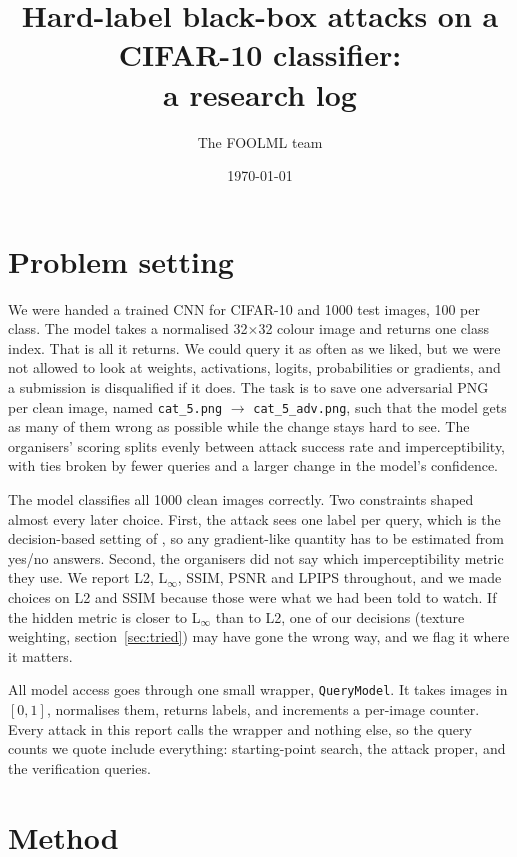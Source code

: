 \documentclass[11pt]{article}
\title{Hard-label black-box attacks on a CIFAR-10 classifier:\\ a research log}
\author{The FOOLML team}
\date{\today}
\begin{document}
\maketitle

\section{Problem setting}

We were handed a trained CNN for CIFAR-10 \cite{krizhevsky2009} and 1000 test images, 100 per class. The model takes a normalised 32$\times$32 colour image and returns one class index. That is all it returns. We could query it as often as we liked, but we were not allowed to look at weights, activations, logits, probabilities or gradients, and a submission is disqualified if it does. The task is to save one adversarial PNG per clean image, named \texttt{cat\_5.png} $\to$ \texttt{cat\_5\_adv.png}, such that the model gets as many of them wrong as possible while the change stays hard to see. The organisers' scoring splits evenly between attack success rate and imperceptibility, with ties broken by fewer queries and a larger change in the model's confidence.

The model classifies all 1000 clean images correctly. Two constraints shaped almost every later choice. First, the attack sees one label per query, which is the decision-based setting of \cite{brendel2018}, so any gradient-like quantity has to be estimated from yes/no answers. Second, the organisers did not say which imperceptibility metric they use. We report L2, L$_\infty$, SSIM, PSNR and LPIPS \cite{zhang2018lpips} throughout, and we made choices on L2 and SSIM because those were what we had been told to watch. If the hidden metric is closer to L$_\infty$ than to L2, one of our decisions (texture weighting, section~\ref{sec:tried}) may have gone the wrong way, and we flag it where it matters.

All model access goes through one small wrapper, \texttt{QueryModel}. It takes images in $[0,1]$, normalises them, returns labels, and increments a per-image counter. Every attack in this report calls the wrapper and nothing else, so the query counts we quote include everything: starting-point search, the attack proper, and the verification queries.

\section{Method}
\end{document}
